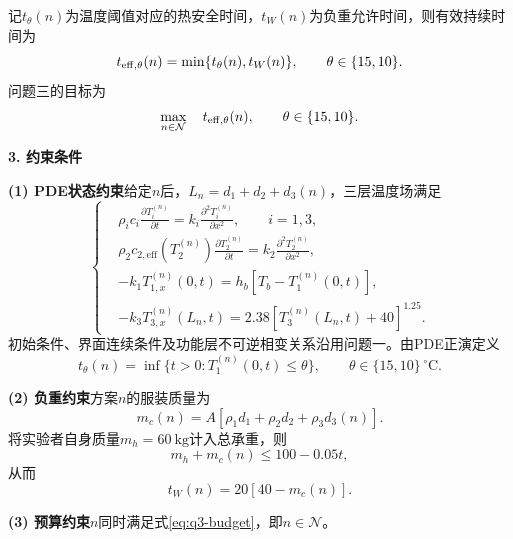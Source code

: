 记$t_\theta(n)$为温度阈值对应的热安全时间，$t_W(n)$为负重允许时间，则有效持续时间为
\begin{equation}
t_{\rm eff,\theta}(n)=\min\{t_{\theta}(n),t_W(n)\},
\qquad \theta\in\{15,10\}.
\label{eq:q3-effective-time}
\end{equation}
问题三的目标为
\begin{equation}
\max_{n\in\mathcal N}\quad t_{\rm eff,\theta}(n),
\qquad \theta\in\{15,10\}.
\label{eq:q3-objective}
\end{equation}

\noindent\textbf{3. 约束条件}\par

\textbf{(1) PDE状态约束}\quad 给定$n$后，$L_n=d_1+d_2+d_3(n)$，三层温度场满足
\begin{equation}
\left\{
\begin{aligned}
&\rho_i c_i\frac{\partial T_i^{(n)}}{\partial t}
=k_i\frac{\partial^2T_i^{(n)}}{\partial x^2},\qquad i=1,3,\\
&\rho_2c_{2,\mathrm{eff}}(T_2^{(n)})\frac{\partial T_2^{(n)}}{\partial t}
=k_2\frac{\partial^2T_2^{(n)}}{\partial x^2},\\
&-k_1T_{1,x}^{(n)}(0,t)=h_b[T_b-T_1^{(n)}(0,t)],\\
&-k_3T_{3,x}^{(n)}(L_n,t)=2.38[T_3^{(n)}(L_n,t)+40]^{1.25}.
\end{aligned}
\right.
\label{eq:q3-pde-state}
\end{equation}
初始条件、界面连续条件及功能层不可逆相变关系沿用问题一。由PDE正演定义
\begin{equation}
t_{\theta}(n)=\inf\{t>0:T_1^{(n)}(0,t)\le\theta\},
\qquad \theta\in\{15,10\}\,^{\circ}\mathrm C.
\label{eq:q3-thermal-time}
\end{equation}

\textbf{(2) 负重约束}\quad 方案$n$的服装质量为
\begin{equation}
m_c(n)=A\left[\rho_1d_1+\rho_2d_2+\rho_3d_3(n)\right].
\label{eq:q3-clothing-mass}
\end{equation}
将实验者自身质量$m_h=60\ \mathrm{kg}$计入总承重，则
\begin{equation}
m_h+m_c(n)\le100-0.05t,
\label{eq:q3-weight-constraint}
\end{equation}
从而
\begin{equation}
t_W(n)=20[40-m_c(n)].
\label{eq:q3-weight-time}
\end{equation}

\textbf{(3) 预算约束}\quad $n$同时满足式\eqref{eq:q3-budget}，即$n\in\mathcal N$。


